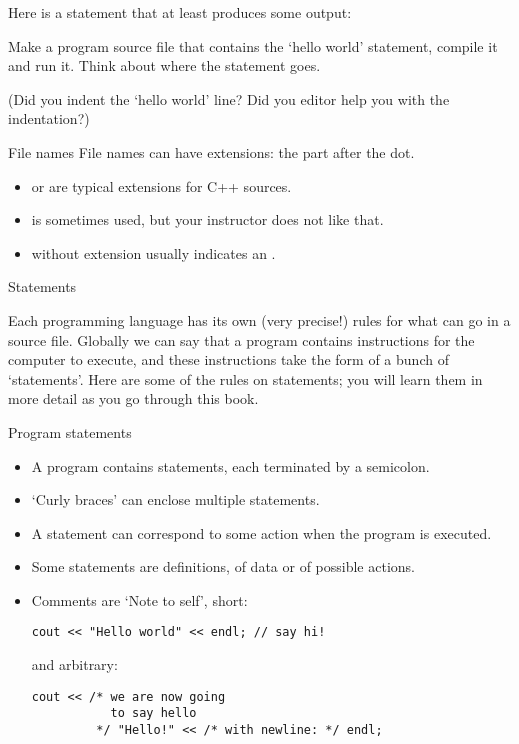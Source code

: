 Here is a statement that at least produces some output:
%


\begin{exercise}
  Make a program source file that contains the `hello world'
  statement, compile it and run it. Think about where the statement goes.

  (Did you indent the `hello world' line? Did you editor help you with
  the indentation?)
\end{exercise}

\begin{block}{File names}
  \label{sl:file-ext}
  File names can have extensions: the part after the dot.
  \begin{itemize}
  \item {} or  are typical extensions for
    C++ sources.
  \item {} is sometimes used, but your instructor does
    not like that.
  \item {} without extension usually indicates an .
  \end{itemize}
\end{block}

 {Statements}
\label{sec:statements}

Each programming language has its own (very precise!) rules for what
can go in a source file. Globally we can say that a program contains
instructions for the computer to execute, and these instructions take
the form of a bunch of `statements'. Here are some of the rules on
statements; you will learn them in more detail as you go through this
book.

\begin{block}{Program statements}
  \label{sl:cstatement}
  \begin{itemize}
  \item
    A program contains statements, each terminated by a semicolon.
  \item `Curly braces' can enclose multiple statements.
  \item A statement can correspond to some action when the program is
    executed.
  \item Some statements are definitions, of data or of possible actions.
  \item Comments are `Note to self', short:
\begin{verbatim}
cout << "Hello world" << endl; // say hi!
\end{verbatim}
and arbitrary:
\begin{verbatim}
cout << /* we are now going
           to say hello
         */ "Hello!" << /* with newline: */ endl;
\end{verbatim}
  \end{itemize}
\end{block}

